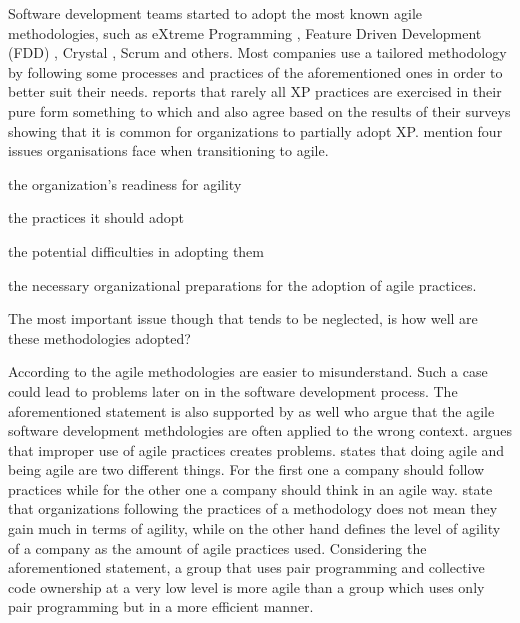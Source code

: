 Software development teams started to adopt the most known agile methodologies, such as eXtreme Programming \cite{Beck:2004:EPE:1076267}, Feature Driven Development (FDD) \cite{Palmer:2001:PGF:600044}, Crystal \cite{Cockburn:2004:CCH:1406822}, Scrum \cite{scrum} and others. Most companies use a tailored methodology by following some processes and practices of the aforementioned ones in order to better suit their needs. \citet{williams2004toward} reports that rarely all XP practices are exercised in their pure form something to which \citet{Reifer} and \cite{aveling} also agree based on the results of their surveys showing that it is common for organizations to partially adopt XP. \citet{sidky} mention four issues organisations face when transitioning to agile.
\begin{inparaenum} [a\upshape)]
\item the organization's readiness for agility
\item the practices it should adopt
\item the potential difficulties in adopting them
\item the necessary organizational preparations for the adoption of agile practices. 
\end{inparaenum}
The most important issue though that tends to be neglected, is how well are these methodologies adopted? 

According to \citet{6427226} the agile methodologies are easier to misunderstand. Such a case could lead to problems later on in the software development process. The aforementioned statement is also supported by \citet{cefam} as well who argue that the agile software development methdologies are often applied to the wrong context. \citet{hossain} argues that improper use of agile practices creates problems. \citet{sahota} states that doing agile and being agile are two different things. For the first one a company should follow practices while for the other one a company should think in an agile way. \citet{lappoA04} state that organizations following the practices of a methodology does not mean they gain much in terms of agility, while on the other hand \citet{sidky_dissertation} defines the level of agility of a company as the amount of agile practices used. Considering the aforementioned statement, a group that uses pair programming and collective code ownership at a very low level is more agile than a group which uses only pair programming but in a more efficient manner.

